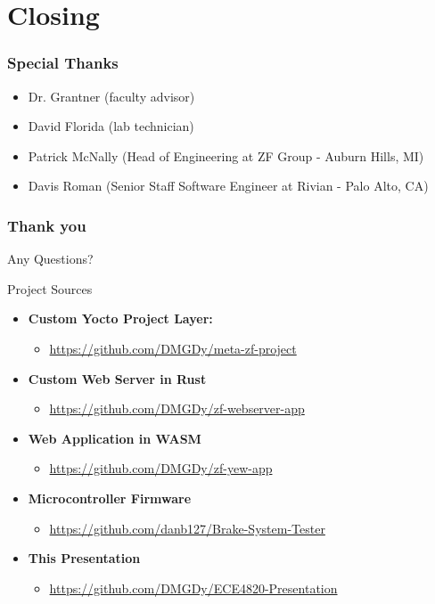 \documentclass[8pt,compress]{beamer}
\newcommand\DarkBoldP[1]{\textcolor{VSPurpleDark}{\textbf{#1}}}
\begin{document}
\section{Closing}
\begin{frame}
  \frametitle{Special Thanks}
  \begin{itemize}
    \item Dr. Grantner (faculty advisor)
    \item David Florida (lab technician)
    \item Patrick McNally (Head of Engineering at ZF Group - Auburn Hills, MI)
    \item Davis Roman (Senior Staff Software Engineer at Rivian - Palo Alto, CA)
  \end{itemize}
\end{frame}

\begin{frame}
  \frametitle{Thank you}
  Any Questions?
  \begin{block}{Project Sources}
    \begin{itemize}
      \item \DarkBoldP{Custom Yocto Project Layer:}
        \begin{itemize}
          \item \url{https://github.com/DMGDy/meta-zf-project}
        \end{itemize}
      \item \DarkBoldP{Custom Web Server in Rust} 
        \begin{itemize}
          \item \url{https://github.com/DMGDy/zf-webserver-app}
        \end{itemize}
      \item \DarkBoldP{Web Application in WASM}
        \begin{itemize}
          \item  \url{https://github.com/DMGDy/zf-yew-app}
        \end{itemize}
      \item \DarkBoldP{Microcontroller Firmware}
        \begin{itemize}
          \item \url{https://github.com/danb127/Brake-System-Tester}
        \end{itemize}
      \item \DarkBoldP{This Presentation}
        \begin{itemize}
          \item \url{https://github.com/DMGDy/ECE4820-Presentation}
        \end{itemize}
    \end{itemize}
  \end{block}
\end{frame}
\end{document}

